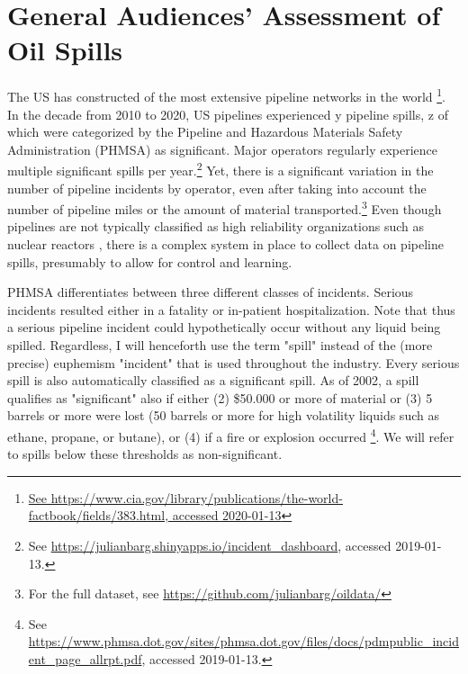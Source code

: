 \section{General Audiences' Assessment of Oil Spills}

The US has constructed of the most extensive pipeline networks in the world \footnote{\url{See https://www.cia.gov/library/publications/the-world-factbook/fields/383.html, accessed 2020-01-13}}. In the decade from 2010 to 2020, US pipelines experienced y pipeline spills, z of which were categorized by the Pipeline and Hazardous Materials Safety Administration (PHMSA) as significant. Major operators regularly experience multiple significant spills per year.\footnote{See \url{https://julianbarg.shinyapps.io/incident_dashboard}, accessed 2019-01-13.} Yet, there is a significant variation in the number of pipeline incidents by operator, even after taking into account the number of pipeline miles or the amount of material transported.\footnote{For the full dataset, see \url{https://github.com/julianbarg/oildata/}} Even though pipelines are not typically classified as high reliability organizations such as nuclear reactors \citep[HROs;][]{Weick1999}, there is a complex system in place to collect data on pipeline spills, presumably to allow for control and learning.

PHMSA differentiates between three different classes of incidents. Serious incidents resulted either in a fatality or in-patient hospitalization. Note that thus a serious pipeline incident could hypothetically occur without any liquid being spilled. Regardless, I will henceforth use the term "spill" instead of the (more precise) euphemism "incident" that is used throughout the industry. Every serious spill is also automatically classified as a significant spill. As of 2002, a spill qualifies as "significant" also if either (2) \$50.000 or more of material or (3) 5 barrels or more were lost (50 barrels or more for high volatility liquids such as ethane, propane, or butane), or (4) if a fire or explosion occurred \footnote{See \url{https://www.phmsa.dot.gov/sites/phmsa.dot.gov/files/docs/pdmpublic_incident_page_allrpt.pdf}, accessed 2019-01-13.}. We will refer to spills below these thresholds as non-significant.

